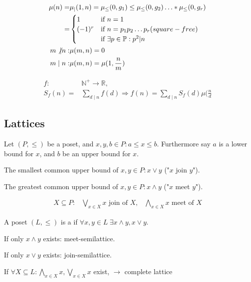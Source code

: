 \begin{align*}
  \mu(n) =& \mu_{|}(1,n) = \mu_{\leq}(0,g_1) \leq \mu_{\leq}(0,g_2) \ldots * \mu_{\leq}(0,g_r) \\
    =& \begin{cases} 
      1 & \text{if } n=1 \\
      (-1)^r & \text{if } n = p_1 p_2 \ldots p_r \text( square-free) \\
       & \text{if } \exists p\in \mathbb{P}: p^2|n
     \end{cases} \\
  m \not| n: &\mu(m,n) = 0 \\
  m \mid n:  &\mu(m,n) = \mu(1, \frac{n}{m}) \\
\end{align*}


\begin{align*}
  f: &\mathbb{N}^{+} \rightarrow \mathbb{R}, \\
  S_f(n) =& \sum_{d\mid n} f(d) \Rightarrow f(n) = \sum_{d\mid n} S_f(d)\mu(\frac{n}{d}
\end{align*}

\subsection{Lattices}
\begin{definition}
Let $(P, \leq)$ be a poset, and $x,y,b \in P: a\leq x \leq b$. Furthermore say $a$ is a lower bound for $x$, and $b$ be an upper bound for $x$.

The smallest common upper bound of $x,y \in P: x \vee y$ ("$x$ join $y$").

The greatest common upper bound of $x,y \in P: x \wedge y$ ("$x$ meet $y$").

\begin{align*}
    X \subseteq P: &\bigvee_{x \in X} x \text{ join of } X, 
        & \bigwedge_{x \in X} x \text{ meet of } X 
\end{align*}
\end{definition}

\begin{definition}
A poset $(L, \leq)$ is a  if $\forall x,y \in L \; \exists x \wedge y, x \vee y$.

If only $x \wedge y$ exists: meet-semilattice. 

If only $x \vee y$ exists: join-semilattice. 


If $\forall X \subseteq L : \bigwedge_{x \in X} x, \bigvee_{x \in X} x$ exist, $\rightarrow$ complete lattice
\end{definition}

